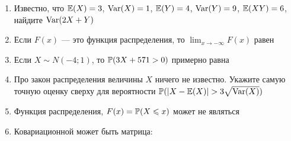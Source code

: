 \documentclass[12pt, a4paper]{article}\usepackage[]{graphicx}\usepackage[]{color}
\begin{document}
\begin{enumerate}

					\item Известно, что $\E(X)=3$, $\Var(X)=1$, $\E(Y)=4$, $\Var(Y)=9$, $\E(XY)=6$, найдите $\Var(2X+Y)$


					\item Если $F(x)$ — это функция распределения, то $\lim_{x\to -\infty}F(x)$ равен


					\item Если $X\sim N(-4;1)$, то $\P(3X+571>0)$ примерно равна


					\item Про закон распределения величины $X$ ничего не известно. Укажите самую точную оценку сверху для вероятности $\P(|X-\E(X)|>3\sqrt{\Var(X)})$


					\item Функция распределения, $F(x)=\P(X\leq x)$ может не являться


					\item Ковариационной может быть матрица:

					\\


\end{enumerate}
\end{document}
